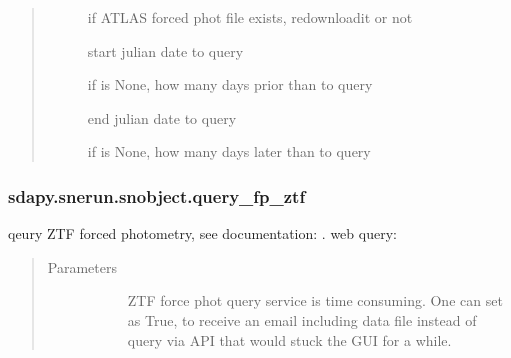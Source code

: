 \documentclass[letterpaper,10pt,english]{sphinxmanual}
\begin{document}
\begin{fulllineitems}
\begin{fulllineitems}
\begin{quote}
\begin{description}
\begin{description}
\item[{}] \leavevmode{[}\sphinxtitleref{bool}{]}
if ATLAS forced phot file exists, re\sphinxhyphen{}downloadit or not

\item[{}] \leavevmode{[}\sphinxtitleref{float}{]}
start julian date to query

\item[{}] \leavevmode{[}\sphinxtitleref{float}{]}
if  is None, how many days prior than  to query

\item[{}] \leavevmode{[}\sphinxtitleref{float}{]}
end julian date to query

\item[{}] \leavevmode{[}\sphinxtitleref{float}{]}
if  is None, how many days later than  to query

\end{description}

\end{description}\end{quote}

\end{fulllineitems}



\subsubsection{sdapy.snerun.snobject.query\_fp\_ztf}
\label{\detokenize{generated/sdapy.snerun.snobject.query_fp_ztf:sdapy-snerun-snobject-query-fp-ztf}}\label{\detokenize{generated/sdapy.snerun.snobject.query_fp_ztf::doc}}

\begin{fulllineitems}
\label{\detokenize{generated/sdapy.snerun.snobject.query_fp_ztf:sdapy.snerun.snobject.query_fp_ztf}}
qeury ZTF forced photometry, 
see documentation: .
web query: 
\begin{quote}\begin{description}
\item[{Parameters}] \leavevmode\begin{description}
\item[{}] \leavevmode{[}\sphinxtitleref{bool}{]}
ZTF force phot query service is time consuming. 
One can set  as True, to receive an email including data file
instead of query via API that would stuck the GUI for a while.


\end{description}
\end{description}
\end{quote}
\end{fulllineitems}
\end{fulllineitems}
\end{document}
